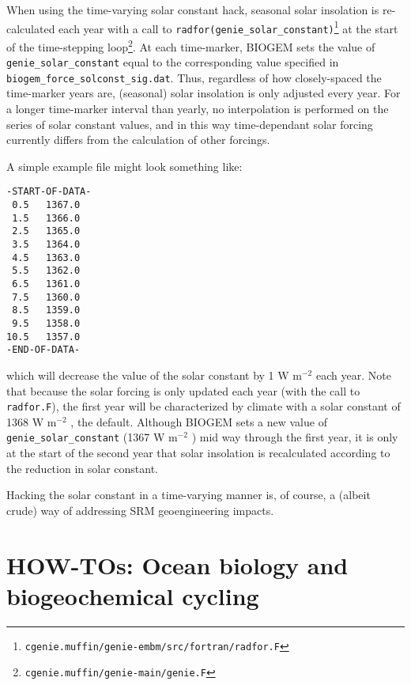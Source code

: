 \documentclass[10pt,twoside]{article}
\begin{document}
When using the time-varying solar constant hack, seasonal solar insolation is re-calculated each year with a call to 
\texttt{radfor(genie\_solar\_constant)}\footnote{\texttt{cgenie.muffin/genie-embm/src/fortran/radfor.F}}
 at the start of the time-stepping loop\footnote{\texttt{cgenie.muffin/genie-main/genie.F}}. At each time-marker, BIOGEM sets the value of \texttt{genie\_solar\_constant} equal to the corresponding value specified in
\texttt{biogem\_force\_solconst\_sig.dat}. Thus, regardless of how closely-spaced the time-marker years are, (seasonal) solar insolation is only adjusted every year. For a longer time-marker interval than yearly, no interpolation is performed on the series of solar constant values, and in this way time-dependant solar forcing currently differs from the calculation of other forcings.

A simple example file might look something like:
\vspace{-10pt}\begin{verbatim}
-START-OF-DATA-
 0.5   1367.0
 1.5   1366.0
 2.5   1365.0
 3.5   1364.0
 4.5   1363.0
 5.5   1362.0
 6.5   1361.0
 7.5   1360.0
 8.5   1359.0
 9.5   1358.0
10.5   1357.0
-END-OF-DATA-
\end{verbatim}\vspace{-5pt}
which will decrease the value of the solar constant by 1 W m\(^{-2}\) each year. Note that because the solar forcing is only updated each year (with the call to \texttt{radfor.F}), the first year will be characterized by climate with a solar constant of 1368 W m\(^{-2}\) , the default. Although BIOGEM sets a new value of \texttt{genie\_solar\_constant} (1367 W m\(^{-2}\) ) mid way through the first year, it is only at the start of the second year that solar insolation is recalculated according to the reduction in solar constant.

Hacking the solar constant in a time-varying manner is, of course, a (albeit crude) way of addressing SRM geoengineering impacts.


\newpage
\section{HOW-TOs: Ocean biology and biogeochemical cycling}\label{how-to-4}
\end{document}
